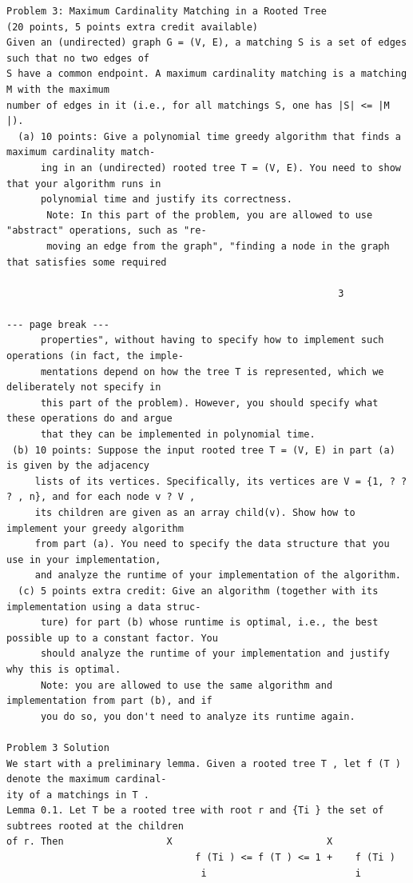 \documentclass[12pt]{article}
\begin{document}
\begin{Verbatim}[breaklines=true,fontsize=\small]
Problem 3: Maximum Cardinality Matching in a Rooted Tree
(20 points, 5 points extra credit available)
Given an (undirected) graph G = (V, E), a matching S is a set of edges such that no two edges of
S have a common endpoint. A maximum cardinality matching is a matching M with the maximum
number of edges in it (i.e., for all matchings S, one has |S| <= |M |).
  (a) 10 points: Give a polynomial time greedy algorithm that finds a maximum cardinality match-
      ing in an (undirected) rooted tree T = (V, E). You need to show that your algorithm runs in
      polynomial time and justify its correctness.
       Note: In this part of the problem, you are allowed to use "abstract" operations, such as "re-
       moving an edge from the graph", "finding a node in the graph that satisfies some required

                                                          3

--- page break ---
      properties", without having to specify how to implement such operations (in fact, the imple-
      mentations depend on how the tree T is represented, which we deliberately not specify in
      this part of the problem). However, you should specify what these operations do and argue
      that they can be implemented in polynomial time.
 (b) 10 points: Suppose the input rooted tree T = (V, E) in part (a) is given by the adjacency
     lists of its vertices. Specifically, its vertices are V = {1, ? ? ? , n}, and for each node v ? V ,
     its children are given as an array child(v). Show how to implement your greedy algorithm
     from part (a). You need to specify the data structure that you use in your implementation,
     and analyze the runtime of your implementation of the algorithm.
  (c) 5 points extra credit: Give an algorithm (together with its implementation using a data struc-
      ture) for part (b) whose runtime is optimal, i.e., the best possible up to a constant factor. You
      should analyze the runtime of your implementation and justify why this is optimal.
      Note: you are allowed to use the same algorithm and implementation from part (b), and if
      you do so, you don't need to analyze its runtime again.

Problem 3 Solution
We start with a preliminary lemma. Given a rooted tree T , let f (T ) denote the maximum cardinal-
ity of a matchings in T .
Lemma 0.1. Let T be a rooted tree with root r and {Ti } the set of subtrees rooted at the children
of r. Then                  X                           X
                                 f (Ti ) <= f (T ) <= 1 +    f (Ti )
                                  i                          i


\end{Verbatim}
\end{document}
